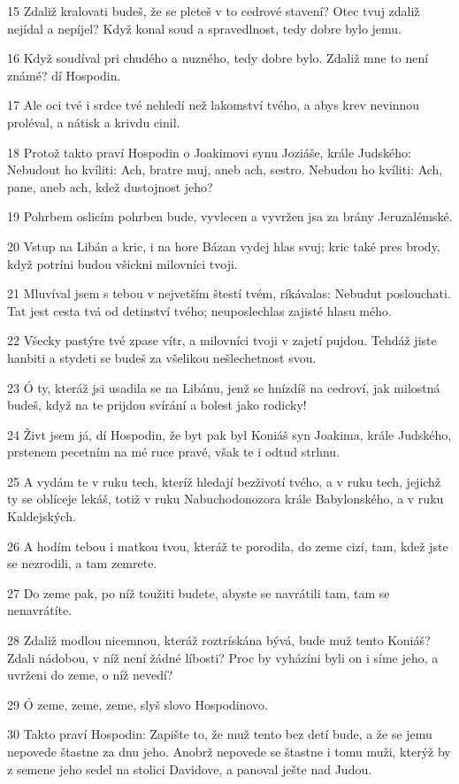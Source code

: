 \par 15 Zdaliž kralovati budeš, že se pleteš v to cedrové stavení? Otec tvuj zdaliž nejídal a nepíjel? Když konal soud a spravedlnost, tedy dobre bylo jemu.
\par 16 Když soudíval pri chudého a nuzného, tedy dobre bylo. Zdaliž mne to není známé? dí Hospodin.
\par 17 Ale oci tvé i srdce tvé nehledí než lakomství tvého, a abys krev nevinnou proléval, a nátisk a krivdu cinil.
\par 18 Protož takto praví Hospodin o Joakimovi synu Joziáše, krále Judského: Nebudout ho kvíliti: Ach, bratre muj, aneb ach, sestro. Nebudou ho kvíliti: Ach, pane, aneb ach, kdež dustojnost jeho?
\par 19 Pohrbem oslicím pohrben bude, vyvlecen a vyvržen jsa za brány Jeruzalémské.
\par 20 Vstup na Libán a kric, i na hore Bázan vydej hlas svuj; kric také pres brody, když potríni budou všickni milovníci tvoji.
\par 21 Mluvíval jsem s tebou v nejvetším štestí tvém, ríkávalas: Nebudut poslouchati. Tat jest cesta tvá od detinství tvého; neuposlechlas zajisté hlasu mého.
\par 22 Všecky pastýre tvé zpase vítr, a milovníci tvoji v zajetí pujdou. Tehdáž jiste hanbiti a stydeti se budeš za všelikou nešlechetnost svou.
\par 23 Ó ty, kteráž jsi usadila se na Libánu, jenž se hnízdíš na cedroví, jak milostná budeš, když na te prijdou svírání a bolest jako rodicky!
\par 24 Živt jsem já, dí Hospodin, že byt pak byl Koniáš syn Joakima, krále Judského, prstenem pecetním na mé ruce pravé, však te i odtud strhnu.
\par 25 A vydám te v ruku tech, kteríž hledají bezživotí tvého, a v ruku tech, jejichž ty se oblíceje lekáš, totiž v ruku Nabuchodonozora krále Babylonského, a v ruku Kaldejských.
\par 26 A hodím tebou i matkou tvou, kteráž te porodila, do zeme cizí, tam, kdež jste se nezrodili, a tam zemrete.
\par 27 Do zeme pak, po níž toužiti budete, abyste se navrátili tam, tam se nenavrátíte.
\par 28 Zdaliž modlou nicemnou, kteráž roztrískána bývá, bude muž tento Koniáš? Zdali nádobou, v níž není žádné líbosti? Proc by vyházíni byli on i síme jeho, a uvrženi do zeme, o níž nevedí?
\par 29 Ó zeme, zeme, zeme, slyš slovo Hospodinovo.
\par 30 Takto praví Hospodin: Zapište to, že muž tento bez detí bude, a že se jemu nepovede štastne za dnu jeho. Anobrž nepovede se štastne i tomu muži, kterýž by z semene jeho sedel na stolici Davidove, a panoval ješte nad Judou.

